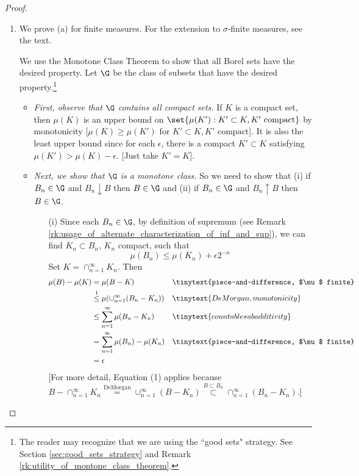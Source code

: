 \documentclass{article} %
\newenvironment{alphabate}
    {\begin{enumerate}[label=\alph*)]}
	{\end{enumerate} }
\begin{document}
\begin{proof}
\;
\begin{alphabate}
\item We prove (a) for finite measures.   For the extension to $\sigma$-finite measures, see the text.  

We use the Monotone Class Theorem to show that all Borel sets have the desired property. Let $\G$ be the class of subsets that have the desired property.\footnote{The reader may recognize that we are using the ``good sets" strategy.  See Section \ref{sec:good_sets_strategy} and Remark \ref{rk:utility_of_montone_class_theorem}.} 
	\begin{itemize}
	\item \textit{First, observe that $\G$ contains all compact sets.}  If $K$ is a compact set, then $\mu(K)$ is an upper bound on $\set{\mu(K') : K' \subset K, K' \text{ compact}}$ by monotonicity {\footnotesize [$\mu(K) \geq \mu(K') \text{ for } K' \subset K,  K' \text{ compact}$].}  It is also the least upper bound since for each $\epsilon$, there is a compact $K' \subset K$ satisfying $\mu(K') > \mu(K) - \epsilon$. {\footnotesize [Just take $K'=K$].}  
	\item \textit{Next, we show that $\G$ is a monotone class.}  So we need to show that (i) if $B_n \in \G$ and $B_n \downarrow B$ then $B \in \G$ and (ii) if $B_n \in \G$ and $B_n \uparrow B$ then $B \in \G$.  
		\begin{itemize}
		\item[(i)] Since each $B_n \in \G$, by definition of supremum (see Remark \ref{rk:usage_of_alternate_characterization_of_inf_and_sup}), we can find $K_n \subset B_n$, $K_n$ compact, such that 
		\[\mu(B_n) \leq \mu(K_n) + \epsilon 2^{-n}\]
		Set $K=\cap_{n=1}^\infty K_n$.   Then
		\begin{align*}
		\mu(B) - \mu(K) &= \mu(B-K) && \tinytext{piece-and-difference, $\mu$ finite} \\
		&\stackrel{1}{\leq} \mu(\cup_{n=1}^\infty (B_n-K_n)) && \tinytext{DeMorgan, monotonicity}\\
		&\leq \sum_{n=1}^\infty \mu(B_n - K_n) && \tinytext{countable subadditivity} \\
		&= 	\sum_{n=1}^\infty \mu(B_n) - \mu(K_n) && \tinytext{piece-and-difference, $\mu$ finite} \\
		&= \epsilon 
		\end{align*}
		{\footnotesize [For more detail, Equation (1) applies because $B - \cap_{n=1}^\infty K_n \stackrel{\text{DeMorgan}}{=} \cup_{n=1}^\infty (B-K_n) \stackrel{B \subset B_n}{\subset} \cap_{n=1}^\infty (B_n - K_n)$.]} \\
		

\end{itemize}
\end{itemize}
\end{alphabate}
\end{proof}
\end{document}
